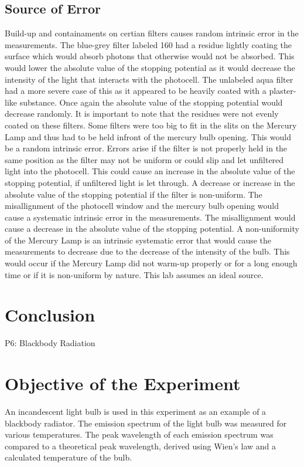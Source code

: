 \documentclass[a4paper]{article}
\begin{document}
\subsection{Source of Error}

\qq Build-up and containaments on certian filters causes random
intrinsic error in the measurements. The blue-grey filter labeled 160
had a residue lightly coating the surface which would absorb photons
that otherwise would not be absorbed. This would lower the absolute
value of the stopping potential as it would decrease the intensity of
the light that interacts with the photocell. The unlabeled aqua filter
had a more severe case of this as it appeared to be heavily coated
with a plaster-like substance. Once again the absolute value of the
stopping potential would decrease randomly. It is important to note
that the residues were not evenly coated on these filters. Some
filters were too big to fit in the slits on the Mercury Lamp and thus
had to be held infront of the mercury bulb opening. This would be a
random intrinsic error. Errors arise if the filter is not properly
held in the same position as the filter may not be uniform or could
slip and let unfiltered light into the photocell. This could cause an
increase in the absolute value of the stopping potential, if
unfiltered light is let through. A decrease or increase in the
absolute value of the stopping potential if the filter is
non-uniform. The misallignment of the photocell window and the mercury
bulb opening would cause a systematic intrinsic error in the
measurements. The misallignment would cause a decrease in the absolute
value of the stopping potential. A non-uniformity of the Mercury Lamp
is an intrinsic systematic error that would cause the measurements to
decrease due to the decrease of the intensity of the bulb. This would
occur if the Mercury Lamp did not warm-up properly or for a long
enough time or if it is non-uniform by nature. This lab assumes an
ideal source.

\section{Conclusion}

\qq %

\newpage

P6: Blackbody Radiation

\newpage

\section{Objective of the Experiment}
\qq An incandescent light bulb is used in this experiment as an example of a blackbody radiator. The emission spectrum of the light bulb was measured for various temperatures. The peak wavelength of each emission spectrum was compared to a theoretical peak wavelength, derived using Wien's law and a calculated temperature of the bulb.
\end{document}

